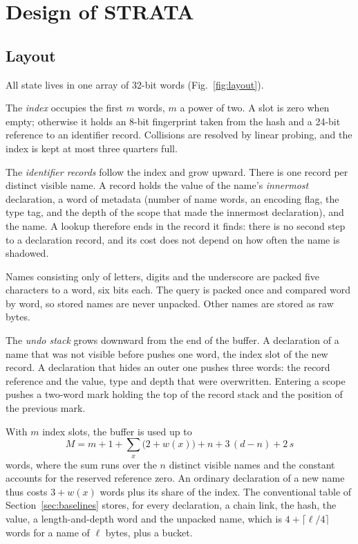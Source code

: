 \section{Design of STRATA}
\label{sec:design}

\subsection{Layout}

All state lives in one array of 32-bit words (Fig.~\ref{fig:layout}).

The \emph{index} occupies the first $m$ words, $m$ a power of two. A slot is zero when empty; otherwise it holds an 8-bit fingerprint taken from the hash and a 24-bit reference to an identifier record. Collisions are resolved by linear probing, and the index is kept at most three quarters full.

The \emph{identifier records} follow the index and grow upward. There is one record per distinct visible name. A record holds the value of the name's \emph{innermost} declaration, a word of metadata (number of name words, an encoding flag, the type tag, and the depth of the scope that made the innermost declaration), and the name. A lookup therefore ends in the record it finds: there is no second step to a declaration record, and its cost does not depend on how often the name is shadowed.

Names consisting only of letters, digits and the underscore are packed five characters to a word, six bits each. The query is packed once and compared word by word, so stored names are never unpacked. Other names are stored as raw bytes.

The \emph{undo stack} grows downward from the end of the buffer. A declaration of a name that was not visible before pushes one word, the index slot of the new record. A declaration that hides an outer one pushes three words: the record reference and the value, type and depth that were overwritten. Entering a scope pushes a two-word mark holding the top of the record stack and the position of the previous mark.

With $m$ index slots, the buffer is used up to
\begin{equation}
M = m + 1 + \sum_{x} \bigl(2 + w(x)\bigr) + n + 3\,(d - n) + 2\,s
\label{eq:memory}
\end{equation}
words, where the sum runs over the $n$ distinct visible names and the constant accounts for the reserved reference zero. An ordinary declaration of a new name thus costs $3 + w(x)$ words plus its share of the index. The conventional table of Section~\ref{sec:baselines} stores, for every declaration, a chain link, the hash, the value, a length-and-depth word and the unpacked name, which is $4 + \lceil \ell/4 \rceil$ words for a name of $\ell$ bytes, plus a bucket.


